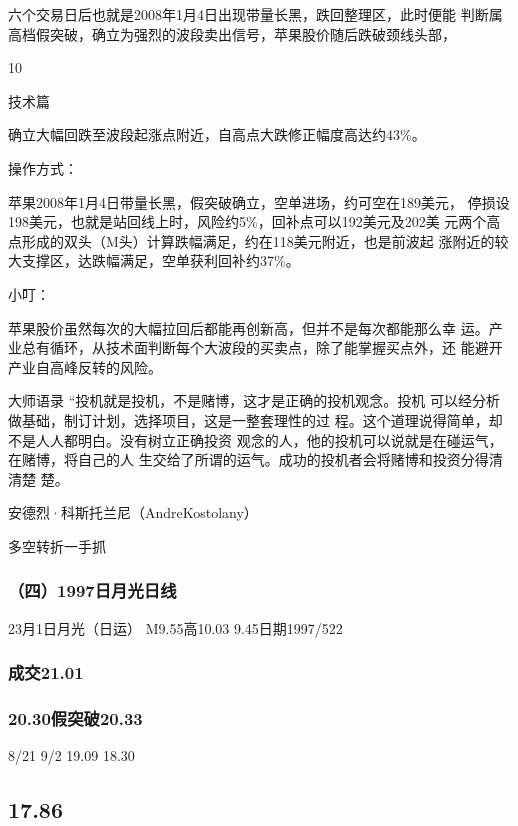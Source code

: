 \documentclass{article}
\begin{document}
六个交易日后也就是2008年1月4日出现带量长黑，跌回整理区，此时便能 判断属高档假突破，确立为强烈的波段卖出信号，苹果股价随后跌破颈线头部，

10

\clearpage

技术篇

确立大幅回跌至波段起涨点附近，自高点大跌修正幅度高达约43\%。

操作方式：

苹果2008年1月4日带量长黑，假突破确立，空单进场，约可空在189美元， 停损设198美元，也就是站回线上时，风险约5\%，回补点可以192美元及202美 元两个高点形成的双头（M头）计算跌幅满足，约在118美元附近，也是前波起 涨附近的较大支撑区，达跌幅满足，空单获利回补约37\%。

小叮：

苹果股价虽然每次的大幅拉回后都能再创新高，但并不是每次都能那么幸 运。产业总有循环，从技术面判断每个大波段的买卖点，除了能掌握买点外，还 能避开产业自高峰反转的风险。

大师语录 “投机就是投机，不是赌博，这才是正确的投机观念。投机 可以经分析做基础，制订计划，选择项目，这是一整套理性的过 程。这个道理说得简单，却不是人人都明白。没有树立正确投资 观念的人，他的投机可以说就是在碰运气，在赌博，将自己的人 生交给了所谓的运气。成功的投机者会将赌博和投资分得清清楚 楚。

安德烈·科斯托兰尼（AndreKostolany）

\clearpage

多空转折一手抓

\subsubsection{（四）1997日月光日线}

23月1日月光（日运） M9.55高10.03 9.45日期1997/522

\subsubsection{成交21.01}

\subsubsection{20.30假突破20.33}

8/21 9/2 19.09 18.30

\subsection{17.86}
\end{document}
